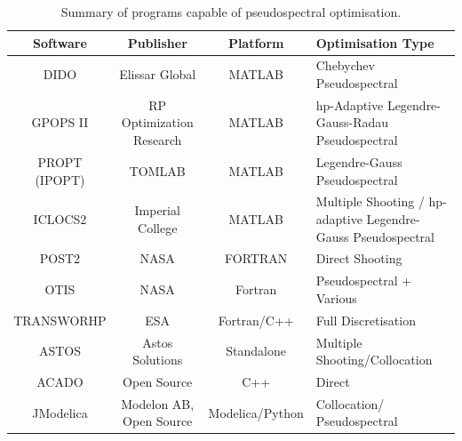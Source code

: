 \begin{table}[ht]
	
	\begin{tabular}{|c|c|c| p{4cm}|}
		\hline \textbf{Software} & \textbf{Publisher} & \textbf{Platform} & \textbf{Optimisation Type} \\ 
		\hline DIDO\cite{Ross2002} & Elissar Global & MATLAB & Chebychev Pseudospectral \\ 
		\hline GPOPS II\cite{Rao2010} & RP Optimization Research & MATLAB & \textsf{hp}-Adaptive Legendre-Gauss-Radau Pseudospectral \\ 
		\hline PROPT (IPOPT)\cite{Rutquist2010}& TOMLAB & MATLAB & Legendre-Gauss  Pseudospectral  \\ 
		\hline ICLOCS2\cite{iclocs} & Imperial College & MATLAB &  Multiple Shooting / \textsf{hp}-adaptive Legendre-Gauss Pseudospectral  \\ 
		\hline POST2\cite{WilliamColson} & NASA & FORTRAN & Direct Shooting \\ 
		\hline OTIS\cite{otis} & NASA  & Fortran & Pseudospectral + Various  \\ 
		\hline TRANSWORHP\cite{Wassel2013} & ESA & Fortran/C++ & Full Discretisation \\ 
		\hline ASTOS\cite{astos} & Astos Solutions & Standalone & Multiple Shooting/Collocation  \\  
		\hline ACADO\cite{Houska2011} & Open Source & C++ &  Direct \\  
		\hline JModelica\cite{jmodelica} & Modelon AB, Open Source & Modelica/Python &  Collocation/ Pseudospectral \\  
		
		\hline 
	\end{tabular} 
	
	\caption{Summary of programs capable of pseudospectral optimisation.}
	\label{table:programs}
\end{table}

